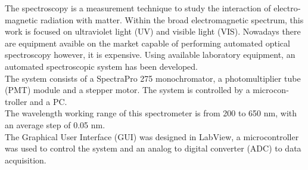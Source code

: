 \begin{otherlanguage}{english}
The spectroscopy is a measurement technique to study the interaction of electromagnetic radiation with matter.
Within the broad electromagnetic spectrum, this work is focused on ultraviolet light (UV) and visible light (VIS). Nowadays there are equipment avaible on the market capable of performing automated optical spectroscopy however, it is expensive. Using available  laboratory equipment, an automated spectroscopic system has been developed. \\
The system consists of a SpectraPro 275 monochromator, a photomultiplier tube (PMT) module and a stepper motor. The system is controlled by a microcontroller and a PC. \\
The wavelength working range of this spectrometer is from 200 to 650 nm, with an average step of 0.05 nm. \\
The Graphical User Interface (GUI) was designed in LabView, a microcontroller was used to control the system and an analog to digital converter (ADC) to data acquisition.

\end{otherlanguage}{}